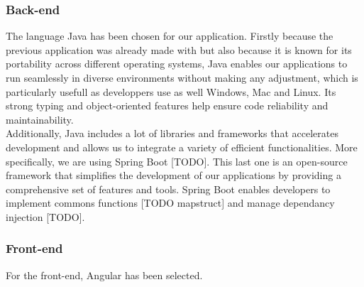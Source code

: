\subsubsection{Back-end}

The language Java has been chosen for our application. Firstly because the previous application was already made with but also because it is known for its portability across different operating systems, Java enables our applications to run seamlessly in diverse environments without making any adjustment, which is particularly usefull as developpers use as well Windows, Mac and Linux. Its strong typing and object-oriented features help ensure code reliability and maintainability.\\

Additionally, Java includes a lot of libraries and frameworks that accelerates development and allows us to integrate a variety of efficient functionalities. More specifically, we are using Spring Boot [TODO]. This last one is an open-source framework that simplifies the development of our applications by providing a comprehensive set of features and tools. Spring Boot enables developers to implement commons functions [TODO mapstruct] and manage dependancy injection [TODO].




\subsubsection{Front-end}

For the front-end, Angular has been selected.



